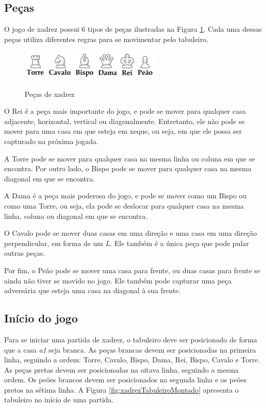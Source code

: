 \subsection[Peças]{Peças}
\label{sub:xadrezPecas}

O jogo de xadrez possui 6 tipos de peças ilustradas na Figura \ref{fig:xadrezPecas}.
Cada uma dessas peças utiliza diferentes regras para se movimentar pelo tabuleiro.

\begin{figure}[H]
    \centering
    \caption{Peças de xadrez}
    \includegraphics[keepaspectratio=true, width=0.6\textwidth]
    	{img/xadrez-pecas.png}
    \label{fig:xadrezPecas}
\end{figure}

O Rei é a peça mais importante do jogo, e pode se mover para qualquer casa adjacente, horizontal, vertical ou diagonalmente.
Entretanto, ele não pode se mover para uma casa em que esteja em xeque, ou seja, em que ele possa ser capturado na próxima jogada.

A Torre pode se mover para qualquer casa na mesma linha ou coluna em que se encontra.
Por outro lado, o Bispo pode se mover para qualquer casa na mesma diagonal em que se encontra.

A Dama é a peça mais poderosa do jogo, e pode se mover como um Bispo ou como uma Torre,
ou seja, ela pode se deslocar para qualquer casa na mesma linha, coluna ou diagonal em que se encontra.

O Cavalo pode se mover duas casas em uma direção e uma casa em uma direção perpendicular, em forma de um \textit{L}.
Ele também é a única peça que pode pular outras peças.

Por fim, o Peão pode se mover uma casa para frente, ou duas casas para frente se ainda não tiver se movido no jogo.
Ele também pode capturar uma peça adversária que esteja uma casa na diagonal à sua frente.

\subsection[Início do jogo]{Início do jogo}
\label{sub:xadrezInicioJogo}

Para se iniciar uma partida de xadrez, o tabuleiro deve ser posicionado de forma que a casa \textit{a1} seja branca.
As peças brancas devem ser posicionadas na primeira linha,
seguindo a ordem: Torre, Cavalo, Bispo, Dama, Rei, Bispo, Cavalo e Torre.
As peças pretas devem ser posicionadas na oitava linha, seguindo a mesma ordem.
Os peões brancos devem ser posicionados na segunda linha e os peões pretos na sétima linha.
A Figura \ref{fig:xadrezTabuleiroMontado} apresenta o tabuleiro no início de uma partida.

